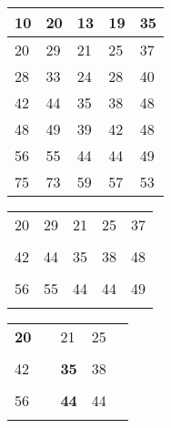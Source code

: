 \documentclass[standalone]{beamer}
\begin{document}
\begin{frame}{}
  \begin{center}
    \begin{tabular}{|p{}|p{}|p{}|p{}|p{}|}
      \hline
      10 & 20 & 13 & 19 & 35 \\ [3ex]
      \hline
      20 & 29 & 21 & 25 & 37 \\ [3ex]
      \hline
      28 & 33 & 24 & 28 & 40 \\ [3ex]
      \hline
      42 & 44 & 35 & 38 & 48 \\ [3ex]
      \hline
      48 & 49 & 39 & 42 & 48 \\ [3ex]
      \hline
      56 & 55 & 44 & 44 & 49 \\ [3ex]
      \hline
      75 & 73 & 59 & 57 & 53 \\ [3ex]
      \hline
    \end{tabular}
  \end{center}
\end{frame}

\begin{frame}{}
  \begin{center}
    \begin{tabular}{|p{}|p{}|p{}|p{}|p{}|}
      \hline
       &  &  &  &  \\ [3ex]
      \hline
      20 & 29 & 21 & 25 & 37 \\ [3ex]
      \hline
       &  &  &  &  \\ [3ex]
      \hline
      42 & 44 & 35 & 38 & 48 \\ [3ex]
      \hline
       &  &  &  &  \\ [3ex]
      \hline
      56 & 55 & 44 & 44 & 49 \\ [3ex]
      \hline
       &  &  &  &  \\ [3ex]
      \hline
    \end{tabular}
  \end{center}
\end{frame}

\begin{frame}{}
  \begin{center}
    \begin{tabular}{|p{}|p{}|p{}|p{}|p{}|}
      \hline
       &  &  &  &  \\ [3ex]
      \hline
      \textbf{20} &  & 21 & 25 &  \\ [3ex]
      \hline
       &  &  &  &  \\ [3ex]
      \hline
      42 &  & \textbf{35} & 38 &  \\ [3ex]
      \hline
       &  &  &  &  \\ [3ex]
      \hline
      56 &  & \textbf{44} & 44 &  \\ [3ex]
      \hline
       &  &  &  &  \\ [3ex]
      \hline
    \end{tabular}
  \end{center}
\end{frame}
\end{document}
